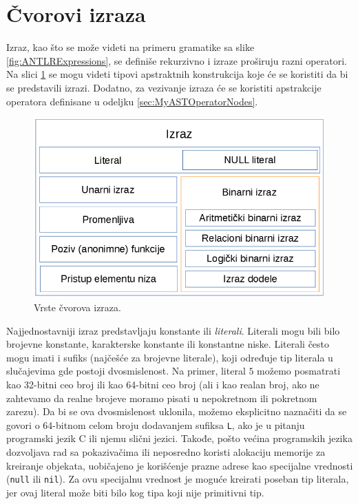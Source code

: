 \section{Čvorovi izraza}
\label{sec:MyASTExpressionNodes}

Izraz, kao što se može videti na primeru gramatike sa slike \ref{fig:ANTLRExpressions}, se definiše rekurzivno i izraze proširuju razni operatori. Na slici \ref{fig:ExpressionNodes} se mogu videti tipovi apstraktnih konstrukcija koje će se koristiti da bi se predstavili izrazi. Dodatno, za vezivanje izraza će se koristiti apstrakcije operatora definisane u odeljku \ref{sec:MyASTOperatorNodes}.

\begin{figure}[h!]
\centering
\includegraphics[scale=0.7]{images/expression_nodes.png}
\caption{Vrste čvorova izraza.}
\label{fig:ExpressionNodes}
\end{figure}

Najjednostavniji izraz predstavljaju konstante ili \emph{literali}. Literali mogu bili bilo brojevne konstante, karakterske konstante ili konstantne niske. Literali često mogu imati i sufiks (najčešće za brojevne literale), koji određuje tip literala u slučajevima gde postoji dvosmislenost. Na primer, literal $5$ možemo posmatrati kao 32-bitni ceo broj ili kao 64-bitni ceo broj (ali i kao realan broj, ako ne zahtevamo da realne brojeve moramo pisati u nepokretnom ili pokretnom zarezu). Da bi se ova dvosmislenost uklonila, možemo eksplicitno naznačiti da se govori o 64-bitnom celom broju dodavanjem sufiksa \texttt{L}, ako je u pitanju programski jezik C ili njemu slični jezici. Takođe, pošto većina programskih jezika dozvoljava rad sa pokazivačima ili neposredno koristi alokaciju memorije za kreiranje objekata, uobičajeno je korišćenje prazne adrese kao specijalne vrednosti (\texttt{null} ili \texttt{nil}). Za ovu specijalnu vrednost je moguće kreirati poseban tip literala, jer ovaj literal može biti bilo kog tipa koji nije primitivni tip.

